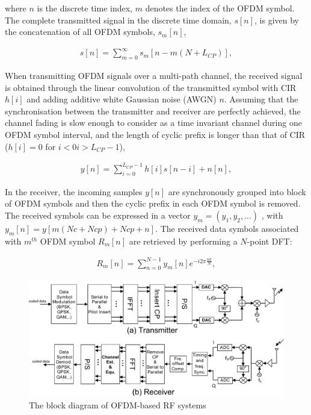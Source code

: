 where $n$ is the discrete time index, $m$ denotes the index of the OFDM symbol. 
The complete transmitted signal in the discrete time domain, $s[n]$, is given by the concatenation of all OFDM symbols, $s_{m}[n]$,

\begin{eqnarray}
\label{equ:OFDMsignal}
s[n] =  \sum_{m=0}^{\infty} s_{m}[n-m(N+L_{CP})],
\end{eqnarray} 

When transmitting OFDM signals over a multi-path channel, the received signal is obtained through the linear convolution of the transmitted symbol with CIR $h[i]$ and adding additive white Gaussian noise (AWGN) $n$. 
Assuming that the synchronisation between the transmitter and receiver are perfectly achieved, the channel fading is slow enough to consider as a time invariant channel during one OFDM symbol interval, and the length of cyclic prefix is longer than that of CIR ($h[i] = 0$ for $i < 0 i > L_{CP}-1$), 

\begin{eqnarray}
\label{equ:OFDMchannelsignal}
y[n] =  \sum_{i=0}^{L_{CP}-1} h[i]s[n-i] + n[n],
\end{eqnarray} 

In the receiver, the incoming samples $y[n]$ are synchronously  grouped into block of OFDM symbols and then the cyclic prefix in each OFDM symbol is removed. 
The received symbols can be expressed in a vector $y_{m} = (y_{1}, y_{2}, . . . )$ , with $y_{m}[n]=y[m(Nc+Ncp)+Ncp +n]$.
The received data symbols associated with $m^{th}$ OFDM symbol $R_{m}[n]$ are retrieved by performing a $N$-point DFT:

\begin{eqnarray}
\label{equ:receiveOFDMsymbol}
R_{m}[n] =  \sum_{n=0}^{N-1} y_{m}[n]e^{-i2\pi \frac{nk}{N}},
\end{eqnarray} 

\begin{figure}
	\centerline{\includegraphics [width=0.8\columnwidth] {Figures/OFDM-block.pdf} }
	\caption{The block diagram of OFDM-based RF systems}
	\label{fig:OFDM-block}
\end{figure}

